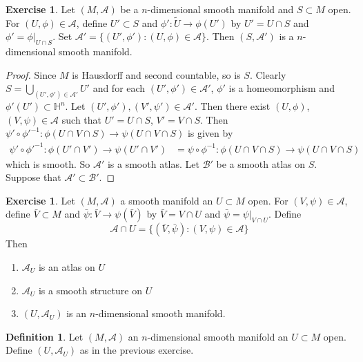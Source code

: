 \documentclass{book}
\theoremstyle{definition}
\newtheorem{defn}[definition]{Definition}
\newtheorem{ex}[definition]{Exercise}
\renewcommand{\H}{\mathbb{H}}
\newcommand{\MA}{\mathcal{A}}
\newcommand{\MB}{\mathcal{B}}
\DeclareMathOperator*{\0}{\mbf{0}}
\DeclareMathOperator*{\1}{\mbf{1}}
\begin{document}
	
	
	
	
	
	
	
	
	
	
	
	
	
	\begin{ex}
	Let $(M, \MA)$ be a $n$-dimensional smooth manifold and $S \subset M$ open. For $(U, \phi) \in \MA$, define $U' \subset S$ and $\phi': \tilde{U} \rightarrow \phi(U')$ by $U' = U \cap S$ and $\phi' = \phi|_{U \cap S}$. Set $\MA' = \{(U', \phi'): (U, \phi) \in \MA\}$.
	Then $(S, \MA')$ is a $n$-dimensional smooth manifold. 
	\end{ex}
	
	\begin{proof}
	Since $M$ is Hausdorff and second countable, so is $S$. Clearly $S= \bigcup\limits_{(U', \phi') \in \MA'} U'$ and for each $(U', \phi') \in \MA'$, $\phi'$ is a homeomorphism and $\phi'(U') \subset \H^n$. Let $(U', \phi'), (V', \psi') \in \MA'$. Then there exist $(U, \phi)$, $(V, \psi) \in \MA$ such that $U' = U \cap S$, $V' = V \cap S$. Then $\psi' \circ \phi'^{-1}: \phi(U \cap V \cap S) \rightarrow \psi(U \cap V \cap S)$ is given by 
	\begin{align*}
	\psi' \circ \phi'^{-1}: \phi(U' \cap V') \rightarrow \psi(U' \cap V')
	&= \psi \circ \phi^{-1}: \phi(U \cap V \cap S) \rightarrow \psi(U \cap V \cap S)
\end{align*}	 
which is smooth. So $\MA'$ is a smooth atlas. Let $\MB'$ be a smooth atlas on $S$. Suppose that $\MA' \subset \MB'$.
	\end{proof}

\begin{ex}
	Let $(M, \MA)$ a smooth manifold an $U \subset M$ open. For $(V, \psi) \in \MA$, define $\bar{V} \subset M $ and $ \bar{\psi}: \bar{V} \rightarrow \psi(\bar{V})$ by $\bar{V} = V \cap U$ and $\bar{\psi} = \psi|_{V \cap U}$. Define $$\MA \cap U = \{(\bar{V}, \bar{\psi}): (V, \psi) \in \MA\}$$ Then 
	\begin{enumerate}
		\item $\MA_U$ is an atlas on $U$
		\item $\MA_U$ is a smooth structure on $U$ 
		\item $(U, \MA_U)$ is an $n$-dimensional smooth manifold.
	\end{enumerate}
\end{ex}

\begin{defn}
	Let $(M, \MA)$ an $n$-dimensional smooth manifold an $U \subset M$ open. Define $(U, \MA_U)$ as in the previous exercise. 
\end{defn}	
	
\end{document}
